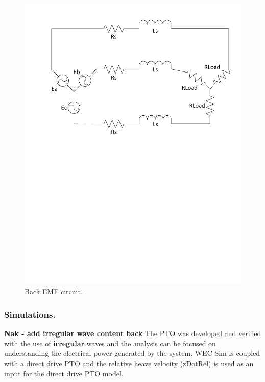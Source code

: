 \documentclass[twocolumn,10pt]{asme2e}
\begin{document}
\begin{figure}[t]
    \centering
    \includegraphics[width=1\columnwidth]{Images/BackEMFCkt}
    \caption{Back EMF circuit.}
    \label{EMF}
    \end{figure}

\subsubsection*{Simulations.}
 \textbf{Nak - add irregular wave content back}
The PTO was developed and verified with the use of \textbf{irregular} waves and the analysis can be focused on understanding the electrical power generated by the system. WEC-Sim is coupled with a direct drive PTO and the relative heave velocity (zDotRel) is used as an input for the direct drive PTO model. 

\end{document}
